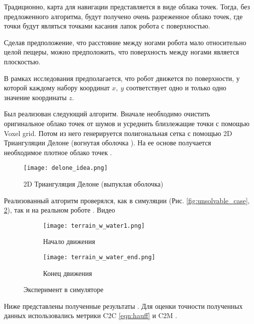 Традиционно, карта для навигации представляется в виде облака точек. Тогда, без предложенного алгоритма, будут получено очень разреженное облако точек, где точки будут являться точками касания лапок робота с поверхностью.

Сделав предположение, что расстояние между ногами робота мало относительно целой пещеры, можно предположить, что поверхность между ногами является плоскостью.


В рамках исследования предполагается, что робот движется по поверхности, у которой каждому набору координат $x,\ y$ соответствует одно и только одно значение координаты $z$.

Был реализован следующий алгоритм. Вначале необходимо очистить оригинальное облако точек от шумов и усреднить близлежащие точки с помощью Voxel grid. Потом из него генерируется полигональная сетка с помощью 2D Триангуляции Делоне  (вогнутая оболочка ). На ее основе получается необходимое плотное облако точек .

\begin{figure}[H]
    \centering\texttt{[image: delone\_idea.png]}
    \caption{2D Триангуляция Делоне (выпуклая оболочка)}
    \label{fig:delone_idea.png}
\end{figure}

Реализованный алгоритм проверялся, как в симуляции (Рис. \ref{fig:unsolvable_case}, \ref{fig:start_end_exp}), так и на реальном роботе . Видео \quad {}


\begin{figure}[H]
    \begin{subfigure}[t]{0.49\textwidth}
        \centering\texttt{[image: terrain\_w\_water1.png]}
        \caption{Начало движения}
    \end{subfigure}
    \begin{subfigure}[t]{0.49\textwidth}
        \centering\texttt{[image: terrain\_w\_water\_end.png]}
        \caption{Конец движения}
    \end{subfigure}
    \caption{Эксперимент в симуляторе}
    \label{fig:start_end_exp}
\end{figure}

Ниже представлены полученные результаты . Для оценки точности полученных данных использовались метрики C2C \eqref{eqn:hauff} и C2M .

